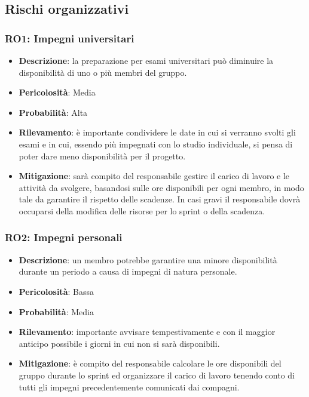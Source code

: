 \documentclass[a4paper, 12pt]{article}
\begin{document}
\subsection{Rischi organizzativi}
\subsubsection{RO1: Impegni universitari}
\begin{itemize}
    \item \textbf{Descrizione}: la preparazione per esami universitari può diminuire la disponibilità di uno o più membri del gruppo.
    \item \textbf{Pericolosità}: Media
    \item \textbf{Probabilità}: Alta
    \item \textbf{Rilevamento}: è importante condividere le date in cui si verranno svolti gli esami e in cui, essendo più impegnati 
    con lo studio individuale, si pensa di poter dare meno disponibilità per il progetto.
    \item \textbf{Mitigazione}: sarà compito del responsabile gestire il carico di lavoro e le attività da svolgere, basandosi sulle ore disponibili per ogni membro,
    in modo tale da garantire il rispetto delle scadenze. In casi gravi il responsabile dovrà occuparsi della modifica delle risorse per lo sprint
    o della scadenza.
\end{itemize}
\subsubsection{RO2: Impegni personali}
\begin{itemize}
    \item \textbf{Descrizione}: un membro potrebbe garantire una minore disponibilità durante un periodo a causa di impegni di natura personale.
    \item \textbf{Pericolosità}: Bassa
    \item \textbf{Probabilità}: Media
    \item \textbf{Rilevamento}: importante avvisare tempestivamente e con il maggior anticipo possibile i giorni in cui non si sarà disponibili. 
    \item \textbf{Mitigazione}: è compito del responsabile calcolare le ore disponibili del gruppo durante lo sprint ed organizzare il carico di lavoro tenendo conto di 
    tutti gli impegni precedentemente comunicati dai compagni. 
\end{itemize}
\end{document}
